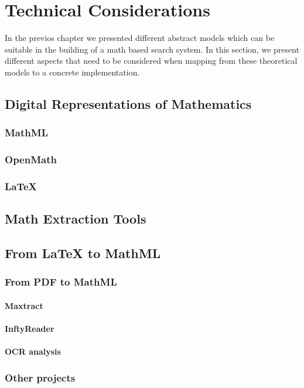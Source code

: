 \chapter{Technical Considerations}
\label{chapter-technical_considerations}
In the previos chapter we presented different abstract models which can be suitable in the building of a math based search system.
In this section, we present different aspects that need to be considered when mapping from these theoretical models to a concrete implementation.

\section{Digital Representations of Mathematics}
\subsection{MathML}
\subsection{OpenMath}
\subsection{LaTeX}

\section{Math Extraction Tools}
\section{From LaTeX to MathML}
\subsection{From PDF to MathML}
\subsubsection{Maxtract}
\subsubsection{InftyReader}
\subsubsection{OCR analysis}
\subsection{Other projects}

